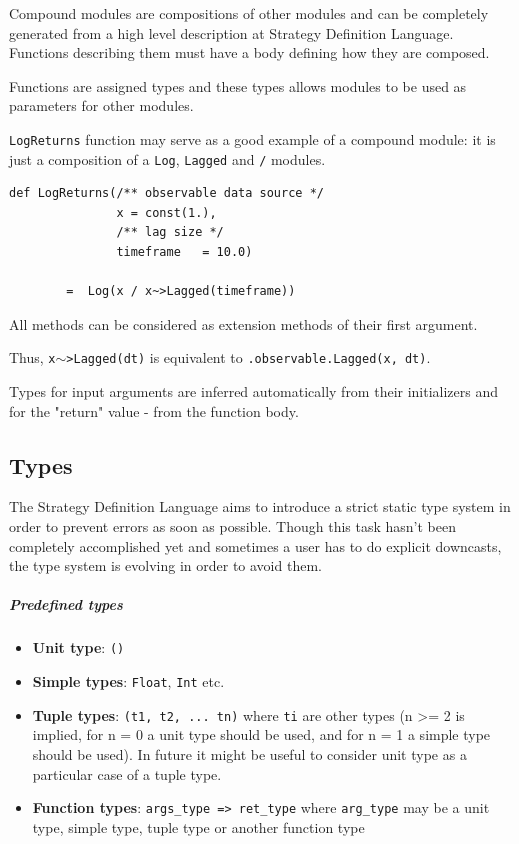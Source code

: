 \documentclass[a4paper,11pt]{article}
\begin{document}
Compound modules are compositions of other modules and can be completely generated from a high level description at Strategy Definition Language. Functions describing them must have a body defining how they are composed.

Functions are assigned types and these types allows modules to be used as parameters for other modules.

\texttt{LogReturns} function may serve as a good example of a compound module: it is just a composition of a \texttt{Log}, \texttt{Lagged} and \texttt{/} modules.

\begin{verbatim}
def LogReturns(/** observable data source */   
               x = const(1.),
               /** lag size */                
               timeframe   = 10.0)

        =  Log(x / x~>Lagged(timeframe))
\end{verbatim}

All methods can be considered as extension methods of their first argument. 

Thus, \texttt{x$\sim$>Lagged(dt)} is equivalent to \texttt{.observable.Lagged(x, dt)}.

Types for input arguments are inferred automatically from their initializers and for the "return" value - from the function body.

\subsection{Types}

The Strategy Definition Language aims to introduce a strict static type system in order to prevent errors as soon as possible. Though this task hasn't been completely accomplished yet and sometimes a user has to do explicit downcasts, the type system is evolving in order to avoid them.


\subparagraph{Predefined types}

\begin{itemize}
\itemsep1pt\parskip0pt
\item
  \textbf{Unit type}: \texttt{()}
\item
  \textbf{Simple types}: \texttt{Float}, \texttt{Int} etc.
\item
  \textbf{Tuple types}: \texttt{(t1, t2, ... tn)} where \texttt{ti} are
  other types (n \textgreater{}= 2 is implied, for n = 0 a unit type
  should be used, and for n = 1 a simple type should be used). In future
  it might be useful to consider unit type as a particular case of a
  tuple type.
\item
  \textbf{Function types}: \texttt{args\_type =\textgreater{} ret\_type}
  where \texttt{arg\_type} may be a unit type, simple type, tuple type
  or another function type
\end{itemize}
\end{document}
